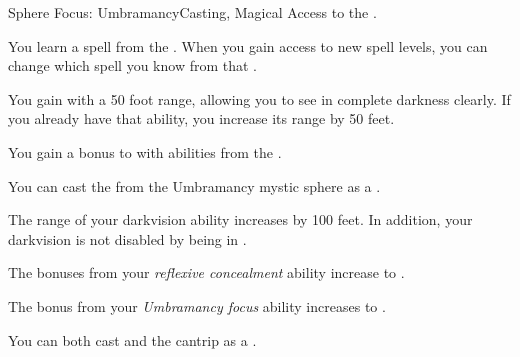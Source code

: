     \begin{feat}{Sphere Focus: Umbramancy}{Casting, Magical}
        \featpre Access to the  .

         You learn a spell from the  .
        When you gain access to new spell levels, you can change which spell you know from that .

         You gain  with a 50 foot range, allowing you to see in complete darkness clearly.
        If you already have that ability, you increase its range by 50 feet.

         You gain a  bonus to  with abilities from the  .

         You can cast the   from the Umbramancy mystic sphere as a .

         The range of your darkvision ability increases by 100 feet.
        In addition, your darkvision is not disabled by being in .

         The bonuses from your \textit{reflexive concealment} ability increase to .

         The bonus from your \textit{Umbramancy focus} ability increases to .

         You can both cast and  the  cantrip as a .
    \end{feat}

